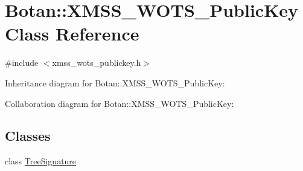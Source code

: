 \hypertarget{class_botan_1_1_x_m_s_s___w_o_t_s___public_key}{}\section{Botan\+:\+:X\+M\+S\+S\+\_\+\+W\+O\+T\+S\+\_\+\+Public\+Key Class Reference}
\label{class_botan_1_1_x_m_s_s___w_o_t_s___public_key}


{\ttfamily \#include $<$xmss\+\_\+wots\+\_\+publickey.\+h$>$}



Inheritance diagram for Botan\+:\+:X\+M\+S\+S\+\_\+\+W\+O\+T\+S\+\_\+\+Public\+Key\+:


Collaboration diagram for Botan\+:\+:X\+M\+S\+S\+\_\+\+W\+O\+T\+S\+\_\+\+Public\+Key\+:
\subsection*{Classes}
\begin{DoxyCompactItemize}
\item 
class \mbox{\hyperlink{class_botan_1_1_x_m_s_s___w_o_t_s___public_key_1_1_tree_signature}{Tree\+Signature}}
\end{DoxyCompactItemize}
